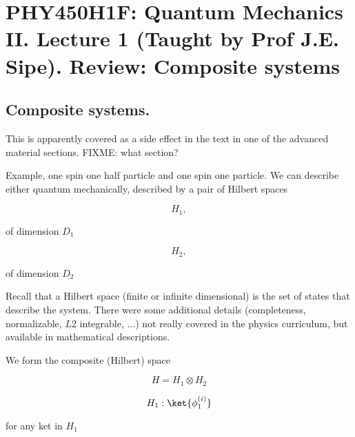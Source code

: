 
%

\chapter{PHY450H1F: Quantum Mechanics II.  Lecture 1 (Taught by Prof J.E. Sipe).  Review: Composite systems}
\label{chap:qmTwoL1}
{}
\date{Sept 12, 2011}

\beginArtWithToc

\section{Composite systems.}

This is apparently covered as a side effect in the text \cite{desai2009quantum} in one of the advanced material sections.  FIXME: what section?

Example, one spin one half particle and one spin one particle.  We can describe either quantum mechanically, described by a pair of Hilbert spaces

\begin{equation}\label{eqn:qmTwoL1:10}
H_1,
\end{equation}

of dimension $D_1$

\begin{equation}\label{eqn:qmTwoL1:30}
H_2,
\end{equation}

of dimension $D_2$

Recall that a Hilbert space (finite or infinite dimensional) is the set of states that describe the system.  There were some additional details (completeness, normalizable, $L2$ integrable, ...) not really covered in the physics curriculum, but available in mathematical descriptions.

We form the composite (Hilbert) space

\begin{equation}\label{eqn:qmTwoL1:50}
H = H_1 \otimes H_2
\end{equation}

\begin{equation}\label{eqn:qmTwoL1:70}
H_1 : { \ket{\phi_1^{(i)}} }
\end{equation}

for any ket in $H_1$

